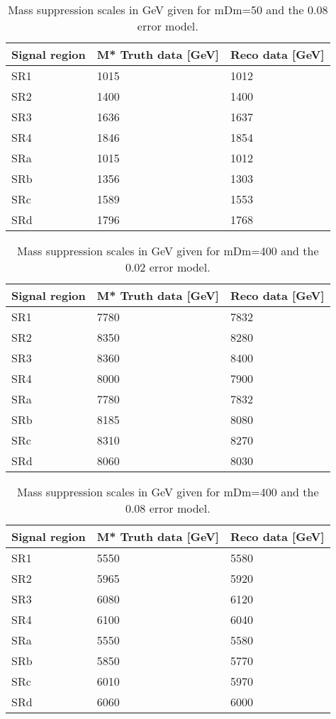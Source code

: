 \begin{table}[ht]
\begin{center}
\begin{tabular}{|l|l|l|}
\hline
Signal region & M* Truth data [GeV]& Reco data [GeV]\\ \hline
SR1&1015&1012\\
SR2&1400&1400\\
SR3&1636&1637\\
SR4&1846&1854\\ \hline
SRa&1015&1012\\
SRb&1356&1303\\
SRc&1589&1553\\
SRd&1796&1768\\ \hline
\end{tabular}
\caption{Mass suppression scales in GeV given for mDm=50 and the 0.08 error model.}
\label{tab:masssupp010}
\end{center}
\end{table}

\begin{table}[ht]
\begin{center}
\begin{tabular}{|l|l|l|}
\hline
Signal region & M* Truth data [GeV]& Reco data [GeV]\\ \hline
SR1&7780&7832\\
SR2&8350&8280\\
SR3&8360&8400\\
SR4&8000&7900\\ \hline
SRa&7780&7832\\
SRb&8185&8080\\
SRc&8310&8270\\
SRd&8060&8030\\ \hline
\end{tabular}
\caption{Mass suppression scales in GeV given for mDm=400 and the 0.02 error model.}
\label{tab:masssupp2002}
\end{center}
\end{table}

\begin{table}[ht]
\begin{center}
\begin{tabular}{|l|l|l|}
\hline
Signal region & M* Truth data [GeV]& Reco data [GeV]\\ \hline
SR1&5550&5580\\
SR2&5965&5920\\
SR3&6080&6120\\
SR4&6100&6040\\ \hline

SRa&5550&5580\\
SRb&5850&5770\\
SRc&6010&5970\\
SRd&6060&6000\\ \hline
\end{tabular}
\caption{Mass suppression scales in GeV given for mDm=400 and the 0.08 error model.}
\label{tab:masssupp2010}
\end{center}
\end{table}

